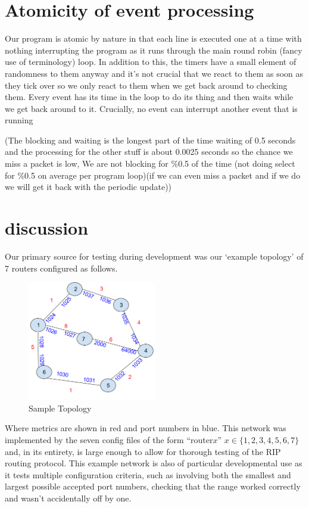 \documentclass[12pt,twoside]{article}
\begin{document}
\section{Atomicity of event processing}

Our program is atomic by nature in that each line is executed one at a time with nothing interrupting the program as it runs through the main round robin (fancy use of terminology) loop. In addition to this, the timers have a small element of randomness to them anyway and it’s not crucial that we react to them as soon as they tick over so we only react to them when we get back around to checking them. Every event has its time in the loop to do its thing and then waits while we get back around to it. Crucially, no event can interrupt another event that is running

(The blocking and waiting is the longest part of the time waiting of 0.5 seconds and the processing for the other stuff is about 0.0025 seconds so the chance we miss a packet is low, We are not blocking for \%0.5 of the time (not doing select for \%0.5 on average per program loop)(if we can even miss a packet and if we do we will get it back with the periodic update))

\section{discussion}
Our primary source for testing during development was our ‘example topology’ of 7 routers configured as follows.

\begin{figure}[htpb]
	\centering
	\includegraphics[width=0.5\textwidth]{Topology_Pic.png} %
	\caption{Sample Topology}
\end{figure}%



Where metrics are shown in red and port numbers in blue. This network was implemented by the seven config files of the form “router$x$” $x\in \{1,2,3,4,5,6,7\}$ and, in its entirety, is large enough to allow for thorough testing of the RIP routing protocol. This example network is also of particular developmental use as it tests multiple configuration criteria, such as involving both the smallest and largest possible accepted port numbers, checking that the range worked correctly and wasn’t accidentally off by one.
\end{document}
